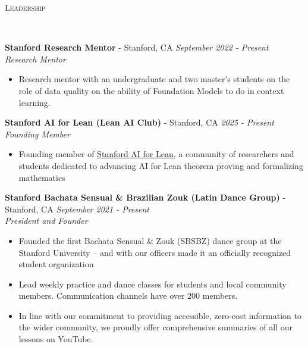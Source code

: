 \documentclass{article}
\newenvironment{changemargin}[2]{%
  \begin{list}{}{%
    \setlength{\topsep}{0pt}%
    \setlength{\leftmargin}{#1}%
    \setlength{\rightmargin}{#2}%
    \setlength{\listparindent}{\parindent}%
    \setlength{\itemindent}{\parindent}%
    \setlength{\parsep}{\parskip}%
  }%
  \item[]}{\end{list}
}
\newcommand{\lineover}{
	\begin{changemargin}{-0.05in}{-0.05in}
		\vspace*{-8pt}
		\hrulefill \\
		\vspace*{-2pt}
	\end{changemargin}
}
\newcommand{\header}[1]{
	\begin{changemargin}{-0.5in}{-0.5in}
		\scshape{#1}\\
  	\lineover
	\end{changemargin}
}
\newenvironment{body} {
	\vspace*{-16pt}
	\begin{changemargin}{-0.25in}{-0.5in}
  }	
	{\end{changemargin}
}
\begin{document}
\newpage

\header{Leadership}

\begin{body}

    \vspace{16pt}

      \textbf{Stanford Research Mentor} - Stanford, CA \hfill \emph{September 2022 - Present}\\
	\emph{Research Mentor}\\
	\vspace*{-3pt}
	\begin{itemize} \itemsep -2pt  %
    	\item Research mentor with an undergraduate and two master's students on the role of data quality on the ability of Foundation Models to do in context learning. 
	\end{itemize}
	\vspace{5 pt}

	\textbf{Stanford AI for Lean (Lean AI Club)} - Stanford, CA \hfill \emph{2025 - Present}\\
	\emph{Founding Member}\\
	\vspace*{-3pt}
	\begin{itemize} \itemsep -2pt  %
    	\item Founding member of \href{https://aiforlean.org/}{Stanford AI for Lean}, a community of researchers and students dedicated to advancing AI for Lean theorem proving and formalizing mathematics
	\end{itemize}
	\vspace{5 pt}

 	\textbf{Stanford Bachata Sensual \& Brazilian Zouk (Latin Dance Group)} - Stanford, CA \hfill \emph{September 2021 - Present}\\
	\emph{President and Founder}\\
	\vspace*{-3pt}
	\begin{itemize} \itemsep -2pt  %
    	\item Founded the first Bachata Sensual \& Zouk (SBSBZ) dance group at the Stanford University -- and with our officers made it an officially recognized student organization
    	\item Lead weekly practice and dance classes for students and local community members. Communication channels have over 200 members.
    	\item In line with our commitment to providing accessible, zero-cost information to the wider community, we proudly offer comprehensive summaries of all our lessons on YouTube.
	\end{itemize}
	\vspace{5 pt}
    

\end{body}
\end{document}
